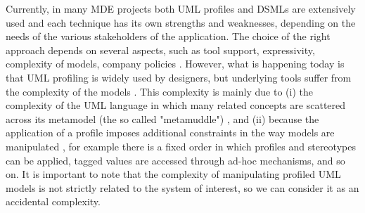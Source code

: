Currently, in many MDE projects both UML profiles and DSMLs are extensively used and
each technique has its own strengths and weaknesses, depending on the needs of the various stakeholders of the application.
The choice of the right approach depends on several aspects, such as tool support, expressivity, 
complexity of models, company policies \cite{comparison}. 
However, what is happening today is that UML profiling is widely used by designers, 
but underlying tools suffer from the complexity of the models \cite{comparison}\cite{france}.
This complexity is mainly due to 
(i) the complexity of the UML language in which many related concepts are scattered across its metamodel 
(the so called "metamuddle") \cite{france}, and 
(ii) because the application of a profile imposes additional constraints in the way models are manipulated \cite{UMLprofile}, for example there is a fixed order in which profiles and stereotypes can be applied, tagged values are accessed through ad-hoc mechanisms, and so on.
It is important to note that the complexity of manipulating profiled UML models is not strictly related to
the system of interest, so we can consider it as an accidental complexity.

